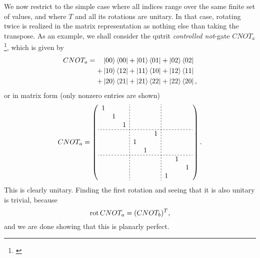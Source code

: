 \bigno
We now restrict to the simple case where all indices range over the same finite set of values, and where $T$ and all its rotations are unitary. In that case, rotating twice is realized in the matrix representation as nothing else than taking the transpose. As an example, we shall consider the qutrit \emph{controlled not}-gate $CNOT_a$\footnote{\cite{ccorbaci2016construction}}, which is given by
\begin{align*}
CNOT_a = 
\phantom{+}& \ket{00}\bra{00} + \ket{01}\bra{01} + \ket{02}\bra{02}\\
+& \ket{10}\bra{12} + \ket{11}\bra{10} + \ket{12}\bra{11}\\
+& \ket{20}\bra{21} + \ket{21}\bra{22} + \ket{22}\bra{20},
\end{align*}
or in matrix form (only nonzero entries are shown)
\begin{align*}
CNOT_a =  \left(
\begin{array}{ccc;{2pt/2pt}ccc;{2pt/2pt}ccc}
1 &   &   &   &   &   &   &   &   \\
  & 1 &   &   &   &   &   &   &   \\
  &   & 1 &   &   &   &   &   &   \\ \hdashline[2pt/2pt]
  &   &   &   &   & 1 &   &   &   \\
  &   &   & 1 &   &   &   &   &   \\
  &   &   &   & 1 &   &   &   &   \\ \hdashline[2pt/2pt]
  &   &   &   &   &   &   & 1 &   \\
  &   &   &   &   &   &   &   & 1 \\
  &   &   &   &   &   & 1 &   &  
\end{array}
\right).
\end{align*}
This is clearly unitary. Finding the first rotation and seeing that it is also unitary is trivial, because \[ \operatorname{rot} CNOT_a = (CNOT_b)^T, \]
and we are done showing that this is planarly perfect.
